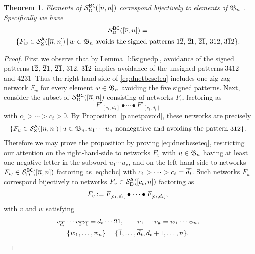 \documentclass[11pt]{article}
\newtheorem{thm}[theo]{Theorem}
\theoremstyle{definition}
\numberwithin{equation}{section}
\begin{document}
\begin{thm}\label{t:dnetbcpavoid}
  Elements of $\mathcal S^{\mathsf{BC}}_{\mathrm D}([\overline{n},n])$ correspond bijectively to
  elements of $\mathfrak{B}_n$ \avoidingsignedp.
  Specifically we have
  \begin{multline}\label{eq:dnetbcseteq}
    \dnet{BC}{[\ol n, n]} = \\
    \{ F_w \in \znet{A}{[\ol n,n]} \,|\, w \in \bn
    \text{ \avoidssignedp }\}.
  \end{multline}
\end{thm}
\begin{proof}
  First we observe that by Lemma~\ref{l:5signedp},
  avoidance of the signed patterns
  $1\overline{2}$, $\overline{2}1$, $\overline{2}\overline{1}$, $312$, $3\overline{1}2$ implies
  avoidance of the unsigned patterns $3412$ and $4231$.
  Thus the right-hand side of \eqref{eq:dnetbcseteq}
  includes one zig-zag network $F_w$ for every element $w\in \mathfrak{B}_n$
  avoiding the five signed patterns.
  Next, consider the subset of $\mathcal S^{\mathsf{BC}}_{\mathrm D}([\overline{n}, n])$
  consisting of networks $F_w$ factoring as
  \begin{equation}\label{eq:bcbc}
    F'_{[c_1,d_1]} \bullet \cdots \bullet F'_{[c_t,d_t]}
  \end{equation}
  with $c_1 > \cdots > c_t > 0$.
  By Proposition~\ref{p:anetpavoid},
  these networks are precisely
  \begin{equation*}
    \{ F_u \in \mathcal S^{\mathsf{A}}_{\mathrm Z}([\overline{n},n]) \,|\, u \in \mathfrak{B}_n,
    u_1 \cdots u_n
    \text{ nonnegative and avoiding the pattern } 312 \}.
\end{equation*}
  Therefore we may prove the proposition
  by proving \eqref{eq:dnetbcseteq},
  restricting our attention
  on the right-hand-side
  to networks $F_u$
  with $u \in \mathfrak{B}_n$ having
  at least one negative letter in the subword $u_1 \cdots u_n$, and
  on the left-hand-side to networks $F_w \in \mathcal S^{\mathsf{BC}}_{\mathrm D}([\overline{n}, n])$
  factoring as
  \eqref{eq:bcbc}
  with $c_1 > \cdots > c_t = \overline{d_t}$.
  Such networks $F_w$ correspond bijectively to networks
  $F_v \in \mathcal S^{\mathsf{A}}_{\mathrm D}([c_t,n])$
  factoring as
  \begin{equation}\label{eq:abc}
  F_v \defeq F_{[c_1,d_1]} \bullet \cdots \bullet F_{[c_t,d_t]},  
  \end{equation}
  with $v$ and $w$ satisfying
  \begin{equation}\label{eq:vw}
    \begin{gathered}
    v_{\ol{d_t}} \cdots v_{\ol 2} v_{\ol 1} = d_t \cdots 21, \qquad
    v_1 \cdots v_n = w_1 \cdots w_n,\\
    \{w_1, \dotsc, w_n \} = \{\ol1, \dotsc, \ol{d_t}, d_t+1,\dotsc, n\}.
   \end{gathered}
  \end{equation}
  

\end{proof}
\end{document}
